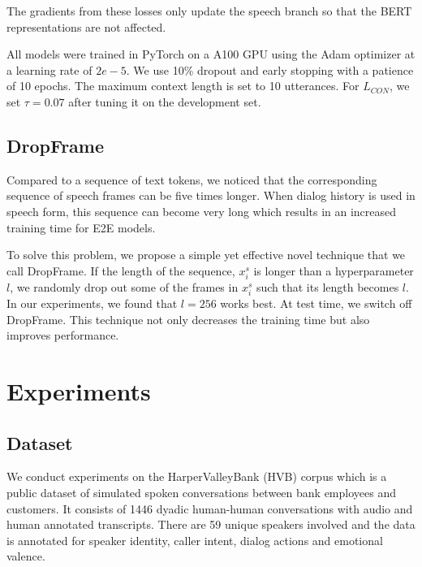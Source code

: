\documentclass{article}
\begin{document}
The gradients from these losses only update the speech branch so that the BERT representations are not affected.

All models were trained in PyTorch on a A100 GPU using the Adam optimizer at a learning rate of $2e-5$. We use 10\% dropout and early stopping with a patience of 10 epochs. The maximum context length is set to 10 utterances. For $L_{CON}$, we set $\tau = 0.07$ after tuning it on the development set.

\subsection{DropFrame}
\label{sec:df}
Compared to a sequence of text tokens, we noticed that the corresponding sequence of speech frames can be five times longer. When dialog history is used in speech form, this sequence can become very long which results in an increased training time for E2E models.


To solve this problem, we propose a simple yet effective novel technique that we call DropFrame. If the length of the sequence, $x_i^s$ is longer than a hyperparameter $l$, we randomly drop out some of the frames in $x_i^s$ such that its length becomes $l$. In our experiments, we found that $l=256$ works best. At test time, we switch off DropFrame. 
This technique not only decreases the training time but also improves performance.

\section{Experiments}
\label{sec:exp}

\subsection{Dataset}
\label{subsec:data}
We conduct experiments on the HarperValleyBank (HVB) corpus \cite{wu2020harpervalleybank} which is a public dataset of simulated spoken conversations between bank employees and customers. It consists of 1446 dyadic human-human conversations with audio and human annotated transcripts. There are 59 unique speakers involved and the data is annotated for speaker identity, caller intent, dialog actions and emotional valence.
\end{document}

